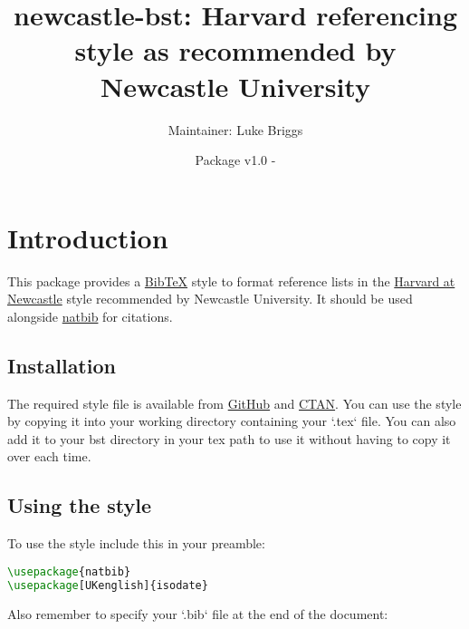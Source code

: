 \documentclass{article}
\begin{document}
\title{newcastle-bst: Harvard referencing style as recommended by Newcastle University}
\author{Maintainer: Luke Briggs}
\date{Package v1.0 - }
\maketitle

\section{Introduction}
This package provides a \href{https://ctan.org/pkg/README.md/BibTeX}{BibTeX} style to format reference lists in the \href{https://libguides.ncl.ac.uk/managing/harvard}{Harvard at Newcastle} style recommended by Newcastle University. 
It should be used alongside \href{https://ctan.org/pkg/README.md/natbib}{natbib} for citations.

\subsection{Installation}
The required style file is available from \href{https://github.com/LukeBriggsDev/Newcastle-BibTeX}{GitHub} and \href{https://ctan.org/pkg/newcastle-bst}{CTAN}. 
You can use the style by copying it into your working directory containing your `.tex` file. 
You can also add it to your bst directory in your tex path to use it without having to copy it over each time.

\subsection{Using the style}
To use the style include this in your preamble:
\begin{lstlisting}[language=tex]
\usepackage{natbib}
\usepackage[UKenglish]{isodate}

\end{lstlisting}

Also remember to specify your `.bib` file at the end of the document:
\begin{lstlisting}[language=tex]

\end{lstlisting}
\end{document}
